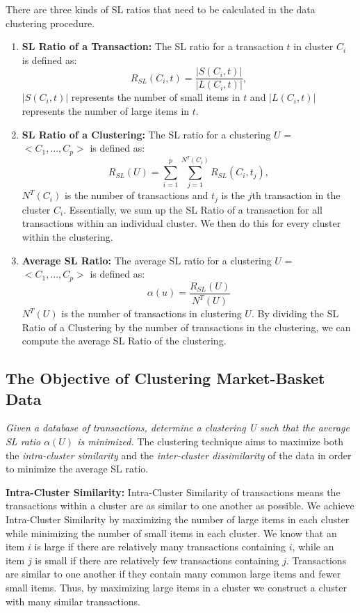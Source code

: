 \documentclass[11pt,reqno]{amsart}
\theoremstyle{definition}
\numberwithin{equation}{subsection}
\begin{document}
There are three kinds of SL ratios that need to be calculated in the data clustering procedure.
	\begin{enumerate}


	\item \textbf{SL Ratio of a Transaction:} The SL ratio for a transaction $t$ in cluster $C_i$ is defined as:
	$$R_{SL}(C_i, t) = \frac{|S(C_i,t)|}{|L(C_i, t)|} ,$$
$|S(C_i,t)|$ represents the number of small items in $t$ and $|L(C_i,t)|$ represents the number of large items in $t$.


	\item \textbf{SL Ratio of a Clustering:} The SL ratio for a clustering $U$ = $<C_1, ..., C_p>$ is defined as:
	$$R_{SL}(U) = \sum_{i=1}^{p} \sum_{j=1}^{N^T(C_i)} R_{SL}(C_i, t_j), $$
	$N^T(C_i)$ is the number of transactions and $t_j$ is the $j$th transaction in the cluster $C_i$. Essentially, we sum up the SL Ratio of a transaction for all transactions within an individual cluster. We then do this for every cluster within the clustering.
	
	
	
	\item \textbf{Average SL Ratio:} The average SL ratio for a clustering $U$ = $<C_1, ..., C_p>$ is defined as:
	$$\alpha(u) = \frac{R_{SL}(U)}{N^T(U)}$$
	 $N^T(U)$ is the number of transactions in clustering $U$. By dividing the SL Ratio of a Clustering by the number of transactions in the clustering, we can compute the average SL Ratio of the clustering.
	
	\end{enumerate}

\subsection{The Objective of Clustering Market-Basket Data}

{\em Given a database of transactions, determine a clustering U such that the average SL ratio $\alpha(U)$ is minimized.}  The clustering technique aims to maximize both the {\em intra-cluster similarity} and the {\em inter-cluster dissimilarity} of the data in order to minimize the average SL ratio. 

\textbf{Intra-Cluster Similarity:} Intra-Cluster Similarity of transactions means the transactions within a cluster are as similar to one another as possible. We achieve Intra-Cluster Similarity by maximizing the number of large items in each cluster while minimizing the number of small items in each cluster. We know that an item $i$ is large if there are relatively many transactions containing $i$, while an item $j$ is small if there are relatively few transactions containing $j$. Transactions are similar to one another if they contain many common large items and fewer small items. Thus, by maximizing large items in a cluster we construct a cluster with many similar transactions.
\end{document}
